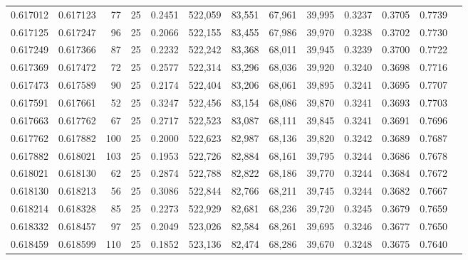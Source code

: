 \begin{tabular}{rrrrrrrrrrrrr}
0.617012 & 0.617123 &    77 &  25 &                                     0.2451 & 522,059 &  83,551 &  67,961 &  39,995 & 0.3237 & 0.3705 & 0.7739 \\
0.617125 & 0.617247 &    96 &  25 &                                     0.2066 & 522,155 &  83,455 &  67,986 &  39,970 & 0.3238 & 0.3702 & 0.7730 \\
0.617249 & 0.617366 &    87 &  25 &                                     0.2232 & 522,242 &  83,368 &  68,011 &  39,945 & 0.3239 & 0.3700 & 0.7722 \\
0.617369 & 0.617472 &    72 &  25 &                                     0.2577 & 522,314 &  83,296 &  68,036 &  39,920 & 0.3240 & 0.3698 & 0.7716 \\
0.617473 & 0.617589 &    90 &  25 &                                     0.2174 & 522,404 &  83,206 &  68,061 &  39,895 & 0.3241 & 0.3695 & 0.7707 \\
0.617591 & 0.617661 &    52 &  25 &                                     0.3247 & 522,456 &  83,154 &  68,086 &  39,870 & 0.3241 & 0.3693 & 0.7703 \\
0.617663 & 0.617762 &    67 &  25 &                                     0.2717 & 522,523 &  83,087 &  68,111 &  39,845 & 0.3241 & 0.3691 & 0.7696 \\
0.617762 & 0.617882 &   100 &  25 &                                     0.2000 & 522,623 &  82,987 &  68,136 &  39,820 & 0.3242 & 0.3689 & 0.7687 \\
0.617882 & 0.618021 &   103 &  25 &                                     0.1953 & 522,726 &  82,884 &  68,161 &  39,795 & 0.3244 & 0.3686 & 0.7678 \\
0.618021 & 0.618130 &    62 &  25 &                                     0.2874 & 522,788 &  82,822 &  68,186 &  39,770 & 0.3244 & 0.3684 & 0.7672 \\
0.618130 & 0.618213 &    56 &  25 &                                     0.3086 & 522,844 &  82,766 &  68,211 &  39,745 & 0.3244 & 0.3682 & 0.7667 \\
0.618214 & 0.618328 &    85 &  25 &                                     0.2273 & 522,929 &  82,681 &  68,236 &  39,720 & 0.3245 & 0.3679 & 0.7659 \\
0.618332 & 0.618457 &    97 &  25 &                                     0.2049 & 523,026 &  82,584 &  68,261 &  39,695 & 0.3246 & 0.3677 & 0.7650 \\
0.618459 & 0.618599 &   110 &  25 &                                     0.1852 & 523,136 &  82,474 &  68,286 &  39,670 & 0.3248 & 0.3675 & 0.7640 \\

\end{tabular}
